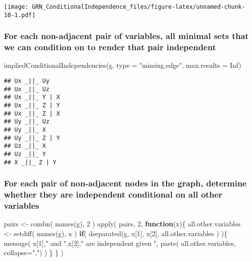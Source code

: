\documentclass[
]{article}
\newenvironment{Shaded}{\begin{snugshade}}{\end{snugshade}}
\newcommand{\AttributeTok}[1]{\textcolor[rgb]{0.77,0.63,0.00}{#1}}
\newcommand{\ConstantTok}[1]{\textcolor[rgb]{0.00,0.00,0.00}{#1}}
\newcommand{\ControlFlowTok}[1]{\textcolor[rgb]{0.13,0.29,0.53}{\textbf{#1}}}
\newcommand{\DecValTok}[1]{\textcolor[rgb]{0.00,0.00,0.81}{#1}}
\newcommand{\FunctionTok}[1]{\textcolor[rgb]{0.00,0.00,0.00}{#1}}
\newcommand{\NormalTok}[1]{#1}
\newcommand{\OtherTok}[1]{\textcolor[rgb]{0.56,0.35,0.01}{#1}}
\newcommand{\StringTok}[1]{\textcolor[rgb]{0.31,0.60,0.02}{#1}}
\begin{document}
\texttt{[image: GRN\_ConditionalIndependence\_files/figure-latex/unnamed-chunk-10-1.pdf]}

\hypertarget{for-each-non-adjacent-pair-of-variables-all-minimal-sets-that-we-can-condition-on-to-render-that-pair-independent-1}{%
\subsubsection{For each non-adjacent pair of variables, all minimal sets
that we can condition on to render that pair
independent}\label{for-each-non-adjacent-pair-of-variables-all-minimal-sets-that-we-can-condition-on-to-render-that-pair-independent-1}}

\begin{Shaded}
\begin{Highlighting}[]
\FunctionTok{impliedConditionalIndependencies}\NormalTok{(g, }\AttributeTok{type =} \StringTok{"missing.edge"}\NormalTok{, }\AttributeTok{max.results =} \ConstantTok{Inf}\NormalTok{)}
\end{Highlighting}
\end{Shaded}

\begin{verbatim}
## Ux _||_ Uy
## Ux _||_ Uz
## Ux _||_ Y | X
## Ux _||_ Z | Y
## Ux _||_ Z | X
## Uy _||_ Uz
## Uy _||_ X
## Uy _||_ Z | Y
## Uz _||_ X
## Uz _||_ Y
## X _||_ Z | Y
\end{verbatim}

\hypertarget{for-each-pair-of-non-adjacent-nodes-in-the-graph-determine-whether-they-are-independent-conditional-on-all-other-variables-1}{%
\subsubsection{For each pair of non-adjacent nodes in the graph,
determine whether they are independent conditional on all other
variables}\label{for-each-pair-of-non-adjacent-nodes-in-the-graph-determine-whether-they-are-independent-conditional-on-all-other-variables-1}}

\begin{Shaded}
\begin{Highlighting}[]
\NormalTok{pairs }\OtherTok{\textless{}{-}} \FunctionTok{combn}\NormalTok{( }\FunctionTok{names}\NormalTok{(g), }\DecValTok{2}\NormalTok{ )}
\FunctionTok{apply}\NormalTok{( pairs, }\DecValTok{2}\NormalTok{, }\ControlFlowTok{function}\NormalTok{(x)\{}
\NormalTok{  all.other.variables }\OtherTok{\textless{}{-}} \FunctionTok{setdiff}\NormalTok{( }\FunctionTok{names}\NormalTok{(g), x )}
  \ControlFlowTok{if}\NormalTok{( }\FunctionTok{dseparated}\NormalTok{(g, x[}\DecValTok{1}\NormalTok{], x[}\DecValTok{2}\NormalTok{], all.other.variables ) )\{}
    \FunctionTok{message}\NormalTok{( x[}\DecValTok{1}\NormalTok{],}\StringTok{" and "}\NormalTok{,x[}\DecValTok{2}\NormalTok{],}\StringTok{" are independent given "}\NormalTok{, }
             \FunctionTok{paste}\NormalTok{( all.other.variables, }\AttributeTok{collapse=}\StringTok{","}\NormalTok{) )}
\NormalTok{  \}}
\NormalTok{\} )}
\end{Highlighting}
\end{Shaded}
\end{document}
